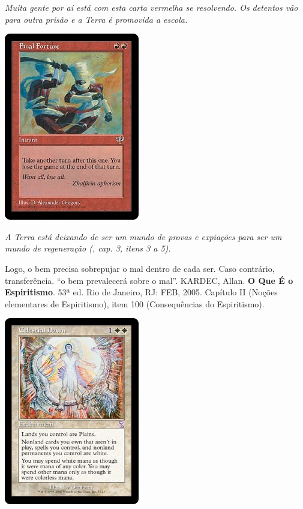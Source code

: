 \documentclass[12pt,a4paper]{article}
\begin{document}
			\emph{Muita gente por a\'i est\'a com esta carta vermelha se resolvendo. Os detentos\cite{crime} v\~ao para outra pris\~ao e a Terra\cite{Terra} \'e promovida a escola.}

			\begin{center}
			\includegraphics{ff}
			\end{center}

			\emph{A Terra\cite{Terra} est\'a deixando de ser um mundo de provas e expia\c{c}\~oes para ser um mundo de regenera\c{c}\~ao (\cite{ese}, cap. 3, itens 3 a 5).}

Logo, o bem precisa sobrepujar o mal dentro de cada ser. Caso contr\'ario, transfer\^encia. \textquotedblleft o bem
prevalecer\'a sobre o mal\textquotedblright. KARDEC, Allan. \textbf{O Que \'E o Espiritismo}. 53ª ed. Rio de Janeiro,
RJ: FEB, 2005. Cap\'itulo II (No\c{c}\~oes elementares de Espiritismo), item 100 (Consequ\^encias do Espiritismo).

			\begin{center}
			\includegraphics{dawn}
			\end{center}
\end{document}

